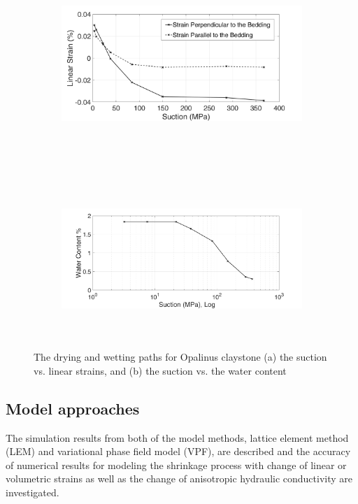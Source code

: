 \begin{figure}[!ht]
\begin{subfigure}[b]{1\textwidth}
\centering
\includegraphics[width=11cm,height=6cm]{figures/Amir_ME6_Strain.png}
\subcaption{}
\label{fig:Amir_ME6_Strain}
\end{subfigure}
\\
\begin{subfigure}[b]{1\textwidth}
\centering
\includegraphics[width=11cm,height=6cm]{figures/Amir_ME6_Water.png}
\subcaption{}
\label{fig:Amir_ME6_Water}
\end{subfigure}
\caption{The drying and wetting paths for Opalinus claystone (a) the suction vs. linear strains, and (b) the suction vs. the water content}
\end{figure}


\subsection{Model approaches}

The simulation results from both of the model methods, lattice element method (LEM) and variational phase field model (VPF), are described and the accuracy of numerical results for modeling the shrinkage process with change of linear or volumetric strains as well as the change of anisotropic hydraulic conductivity are investigated. 

